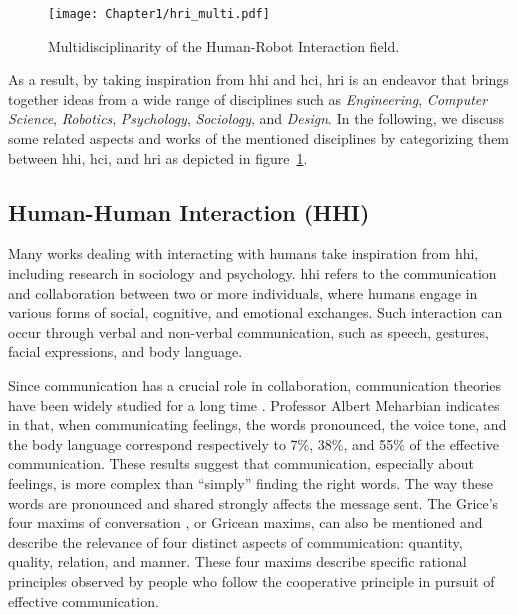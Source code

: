 \begin{figure}[h]
    \center
    \texttt{[image: Chapter1/hri\_multi.pdf]}
    \caption{Multidisciplinarity of the Human-Robot Interaction field.}
    \label{fig:hri_multi}
\end{figure}

As a result, by taking inspiration from \acrfull{hhi} and \acrfull{hci}, \acrshort{hri} is an endeavor that brings together ideas from a wide range of disciplines such as \textit{Engineering}, \textit{Computer Science}, \textit{Robotics}, \textit{Psychology}, \textit{Sociology}, and \textit{Design}.
In the following, we discuss some related aspects and works of the mentioned disciplines by categorizing them between \acrshort{hhi}, \acrshort{hci}, and \acrshort{hri} as depicted in figure~\ref{fig:hri_multi}.

\subsection{Human-Human Interaction (HHI)}

Many works dealing with interacting with humans take inspiration from \acrfull{hhi}, including research in sociology and psychology. \acrshort{hhi} refers to the communication and collaboration between two or more individuals, where humans engage in various forms of social, cognitive, and emotional exchanges. Such interaction can occur through verbal and non-verbal communication, such as speech, gestures, facial expressions, and body language.   

Since communication has a crucial role in collaboration, communication theories have been widely studied for a long time \cite{cherry_human_1957,smith_designing_1998}. Professor Albert Meharbian indicates in \cite{mehrabian1967decoding} that, when communicating feelings, the words pronounced, the voice tone, and the body language correspond respectively to 7\%, 38\%, and 55\% of the effective communication. These results suggest that communication, especially about feelings, is more complex than ``simply'' finding the right words. The way these words are pronounced and shared strongly affects the message sent. The Grice's four maxims of conversation \cite{grice1975logic}, or Gricean maxims, can also be mentioned and describe the relevance of four distinct aspects of communication: quantity, quality, relation, and manner. These four maxims describe specific rational principles observed by people who follow the cooperative principle in pursuit of effective communication.

